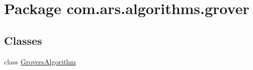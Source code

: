 \hypertarget{namespacecom_1_1ars_1_1algorithms_1_1grover}{}\section{Package com.\+ars.\+algorithms.\+grover}
\label{namespacecom_1_1ars_1_1algorithms_1_1grover}
\subsection*{Classes}
\begin{DoxyCompactItemize}
\item 
class \hyperlink{classcom_1_1ars_1_1algorithms_1_1grover_1_1_grovers_algorithm}{Grovers\+Algorithm}
\end{DoxyCompactItemize}
